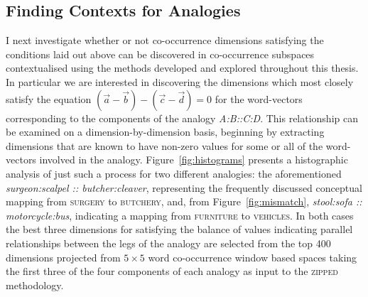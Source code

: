 \subsection{Finding Contexts for Analogies} \label{sec:finding}
I next investigate whether or not co-occurrence dimensions satisfying the conditions laid out above can be discovered in co-occurrence subspaces contextualised using the methods developed and explored throughout this thesis.  In particular we are interested in discovering the dimensions which most closely satisfy the equation $(\overrightarrow{a} - \overrightarrow{b}) - (\overrightarrow{c} - \overrightarrow{d}) = 0$ for the word-vectors corresponding to the components of the analogy \emph{A:B::C:D}.  This relationship can be examined on a dimension-by-dimension basis, beginning by extracting dimensions that are known to have non-zero values for some or all of the word-vectors involved in the analogy.  Figure~\ref{fig:histograms} presents a histographic analysis of just such a process for two different analogies: the aforementioned \emph{surgeon:scalpel :: butcher:cleaver}, representing the frequently discussed conceptual mapping from \textsc{surgery} to \textsc{butchery}, and, from Figure~\ref{fig:mismatch}, \emph{stool:sofa :: motorcycle:bus}, indicating a mapping from \textsc{furniture} to \textsc{vehicles}.  In both cases the best three dimensions for satisfying the balance of values indicating parallel relationships between the legs of the analogy are selected from the top 400 dimensions projected from $5 \times 5$ word co-occurrence window based spaces taking the first three of the four components of each analogy as input to the \textsc{zipped} methodology.

